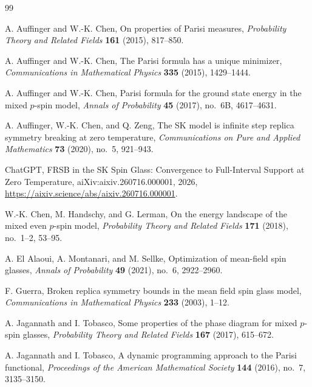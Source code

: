 \documentclass[10pt]{amsart}
\theoremstyle{definition}
\theoremstyle{remark}
\numberwithin{equation}{section}
\newcommand{\1}{\mathbf 1}
\begin{document}
\begin{thebibliography}{99}

A. Auffinger and W.-K. Chen,
\newblock On properties of Parisi measures,
\newblock \emph{Probability Theory and Related Fields} \textbf{161} (2015), 817--850.

A. Auffinger and W.-K. Chen,
\newblock The Parisi formula has a unique minimizer,
\newblock \emph{Communications in Mathematical Physics} \textbf{335} (2015), 1429--1444.

A. Auffinger and W.-K. Chen,
\newblock Parisi formula for the ground state energy in the mixed $p$-spin model,
\newblock \emph{Annals of Probability} \textbf{45} (2017), no.~6B, 4617--4631.

A. Auffinger, W.-K. Chen, and Q. Zeng,
\newblock The SK model is infinite step replica symmetry breaking at zero temperature,
\newblock \emph{Communications on Pure and Applied Mathematics} \textbf{73} (2020), no.~5, 921--943.

ChatGPT,
\newblock FRSB in the SK Spin Glass: Convergence to Full-Interval Support at Zero Temperature,
\newblock aiXiv:aixiv.260716.000001, 2026,
\newblock \url{https://aixiv.science/abs/aixiv.260716.000001}.

W.-K. Chen, M. Handschy, and G. Lerman,
\newblock On the energy landscape of the mixed even $p$-spin model,
\newblock \emph{Probability Theory and Related Fields} \textbf{171} (2018), no.~1--2, 53--95.

A. El Alaoui, A. Montanari, and M. Sellke,
\newblock Optimization of mean-field spin glasses,
\newblock \emph{Annals of Probability} \textbf{49} (2021), no.~6, 2922--2960.

F. Guerra,
\newblock Broken replica symmetry bounds in the mean field spin glass model,
\newblock \emph{Communications in Mathematical Physics} \textbf{233} (2003), 1--12.

A. Jagannath and I. Tobasco,
\newblock Some properties of the phase diagram for mixed $p$-spin glasses,
\newblock \emph{Probability Theory and Related Fields} \textbf{167} (2017), 615--672.

A. Jagannath and I. Tobasco,
\newblock A dynamic programming approach to the Parisi functional,
\newblock \emph{Proceedings of the American Mathematical Society} \textbf{144} (2016), no.~7, 3135--3150.


\end{thebibliography}
\end{document}
